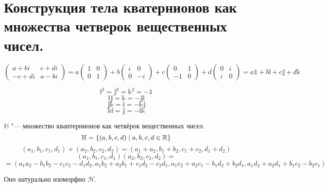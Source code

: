 \section{Конструкция тела кватернионов как множества четверок вещественных чисел.}
$$\left(\begin{matrix}a + bi & c+di \\ -c+di & a-bi\end{matrix}\right) = a \left(\begin{matrix}1 & 0 \\ 0 & 1\end{matrix}\right) + b \left(\begin{matrix}i & 0 \\ 0 & -i\end{matrix}\right) + c\left(\begin{matrix}0 & 1 \\ -1 & 0\end{matrix}\right) + d\left(\begin{matrix}0 & i \\ i & 0\end{matrix}\right) = a\mathbb{1} + b\mathbb{i} + c\mathbb{j} + d\mathbb{k}$$

$$\mathbb{i}^2 = \mathbb{j}^2 = \mathbb{k}^2 = -\mathbb{1}$$
$$\mathbb{ij} = \mathbb{k} = -\mathbb{ji}$$
$$\mathbb{jk} = \mathbb{i} = -\mathbb{kj}$$
$$\mathbb{ki} = \mathbb{j} = -\mathbb{ik}$$

\begin{Def}
$\mathbb{H}$ "--- множество квантернионов как четвёрок вещественных чисел.
$$\mathbb{H} = \left\{(a, b, c, d) \mid a, b, c, d \in \mathbb{R}\right\}$$
$$(a_1, b_1, c_1, d_1) + (a_2, b_2, c_2, d_2) = (a_1 + a_2, b_1 + b_2, c_1 + c_2, d_1 + d_2)$$
$$(a_1, b_1, c_1, d_1) (a_2, b_2, c_2, d_2) = $$
$$ = (a_1a_2 - b_1b_2 - c_1c_2 - d_1d_2, a_1b_2 + a_2b_1 + c_1d_2 - c_2d_1, a_1c_2 + a_2c_1 - b_1d_2 + b_2d_1, a_1d_2 + a_2d_1 + b_1c_2 - b_2c_1)$$
\end{Def}
Оно натурально изоморфно $\mathcal{H}$.